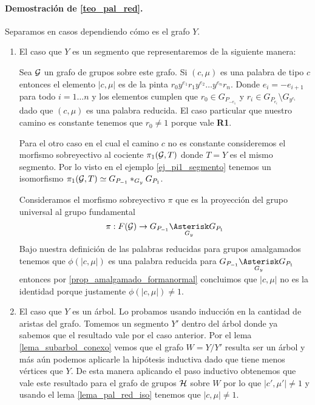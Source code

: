 \documentclass[tesis.tex]{subfiles}
\begin{document}
\paragraph{Demostración de \ref{teo_pal_red}.}
Separamos en casos dependiendo cómo es el grafo $Y$.
	\begin{enumerate}
		\item El caso que $Y$ es un segmento que representaremos de la siguiente manera:
		
		\begin{center}
		\end{center}
		Sea ${\cal G}$ un grafo de grupos sobre este grafo.		
		Si $(c, \mu)$ es una palabra de tipo $c$ entonces el elemento $|c, \mu|$ es de la pinta $r_0y^{e_1}r_1y^{e_2}\dots y^{e_n}r_n$.
		Donde $e_{i} = -e_{i+1}$ para todo $i=1 \dots n$ y los elementos cumplen que $r_0 \in G_{P_{-e_1}}$ y $r_i \in G_{P_{e_i}} \setminus G_{y^{e_i}}$ dado que $(c, \mu)$ es una palabra reducida.
		El caso particular que nuestro camino es constante tenemos que $r_0 \neq 1$ porque vale \textbf{R1}.
		
		Para el otro caso en el cual  el camino $c$ no es constante consideremos el morfismo sobreyectivo al cociente $\pi_1({\cal G},T)$ donde $T=Y$ es el mismo segmento.
		Por lo visto en el ejemplo \ref{ej_pi1_segmento} tenemos un isomorfismo $\pi_1({\cal G}, T) \simeq G_{P_{-1}} \ast_{G_y} G_{P_1}$. 
		
		Consideramos el morfismo sobreyectivo $\pi$ que es la proyección del grupo universal al grupo fundamental
		\[
		\pi: F(\cG) \to G_{P_{-1}} \underset{G_y}{\Asterisk} G_{P_1}
		\]
		Bajo nuestra definición de las palabras reducidas para grupos
		amalgamados tenemos que $\phi(|c, \mu|)$ es una palabra reducida para $G_{P_{-1}} \underset{G_y}{\Asterisk} G_{P_1}$ entonces por \ref{prop_amalgamado_formanormal} concluimos que $|c, \mu|$ no es la identidad porque justamente $\phi(|c,\mu|) \neq 1$.
		
		
		\item El caso que $Y$ es un árbol. 
		Lo probamos usando inducción en la cantidad de aristas del grafo.
		Tomemos un segmento $Y'$ dentro del árbol donde ya sabemos que el resultado vale por el caso anterior.
		Por el lema \ref{lema_subarbol_conexo} vemos que el grafo $W = Y / Y'$ resulta ser un árbol y más aún podemos aplicarle la hipótesis inductiva dado que tiene menos vértices que $Y$. 
		De esta manera aplicando el paso inductivo obtenemos que vale este resultado para el grafo de grupos ${\cal H}$ sobre $W$ por lo que $|c',\mu'| \neq 1$ y usando el lema \ref{lema_pal_red_iso} tenemos que $|c, \mu| \neq 1$.
		

\end{enumerate}
\end{document}
